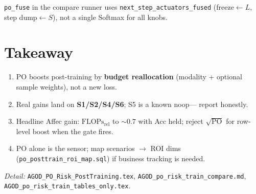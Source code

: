 \documentclass[11pt]{article}
\newcommand{\PO}{\mathrm{PO}}
\newcommand{\Flops}{\mathrm{FLOPs}_{\mathrm{rel}}}
\begin{document}
\noindent\texttt{po\_fuse} in the compare runner uses
\texttt{next\_step\_actuators\_fused} (freeze$\leftarrow L$,
step dump$\leftarrow S$), not a single Softmax for all knobs.

\section{Takeaway}
\begin{enumerate}[leftmargin=1.2em,itemsep=2pt]
  \item PO boosts post-training by \textbf{budget reallocation}
        (modality + optional sample weights), not a new loss.
  \item Real gains land on \textbf{S1/S2/S4/S6}; S5 is a known noop---
        report honestly.
  \item Headline Affec gain: $\Flops$ to $\sim0.7$ with Acc held;
        reject $\sqrt{\PO}$ for row-level boost when the gate fires.
  \item PO alone is the sensor; map scenarios $\to$ ROI dims
        (\texttt{po\_posttrain\_roi\_map.sql}) if business tracking is needed.
\end{enumerate}

\vspace{0.5em}
\noindent\textit{Detail:} \texttt{AGOD\_PO\_Risk\_PostTraining.tex},
\texttt{AGOD\_po\_risk\_train\_compare.md},
\texttt{AGOD\_po\_risk\_train\_tables\_only.tex}.
\end{document}

